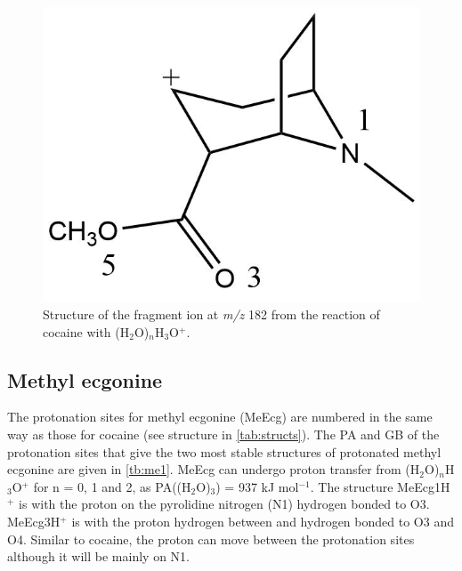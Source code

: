 \begin{figure}[htbp]
\centering
\includegraphics[width=0.25\linewidth]{pics/cocaine-chapter/coc_182.png}
\caption{Structure of the fragment ion at \textit{m/z} 182 from the reaction of cocaine with (H$_2$O)$_n$H$_3$O$^+$.}
\label{fig:coc_182}
\end{figure}






 
 

\subsection{Methyl ecgonine}

The protonation sites for methyl ecgonine (MeEcg) are numbered in the same way as those for cocaine (see structure in \autoref{tab:structs}). 
%
The PA and GB of the protonation sites that give the two most stable structures of protonated methyl ecgonine are given in \autoref{tb:me1}.
%
MeEcg can undergo proton transfer from (H$_2$O)$_n$H$_3$O$^+$ for n = 0, 1 and 2, as PA((H$_2$O)$_3$) = 937 kJ mol$^{-1}$.
%
The structure MeEcg1H$^+$ is with the proton on the pyrolidine nitrogen (N1) hydrogen bonded to O3. 
%
MeEcg3H$^+$ is with the proton hydrogen between and hydrogen bonded to O3 and O4.
%
Similar to cocaine, the proton can move between the protonation sites although it will be mainly  on N1. 
%



